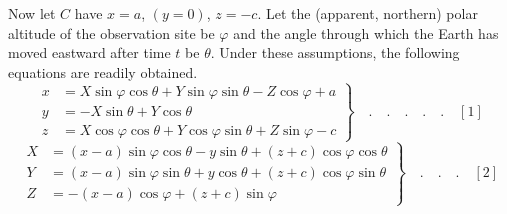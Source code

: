 Now let $C$ have $x=a$, $(y=0)$, $z=-c$. Let the (apparent, northern) polar altitude of the observation site be $\varphi$ and the angle through which the Earth has moved eastward after time $t$ be $\theta$. Under these assumptions, the following equations are readily obtained.
\[
\left.\begin{aligned}
x&=X\sin\varphi\cos\theta+Y\sin\varphi\sin\theta-Z\cos\varphi+a\\
y&=-X\sin\theta+Y\cos\theta\\
z&=X\cos\varphi\cos\theta+Y\cos\varphi\sin\theta+Z\sin\varphi-c
\end{aligned}\right\}\quad.\quad.\quad.\quad.\quad.\quad[1]
\]
\[
\left.\begin{aligned}
X&=(x-a)\sin\varphi\cos\theta-y\sin\theta+(z+c)\cos\varphi\cos\theta\\
Y&=(x-a)\sin\varphi\sin\theta+y\cos\theta+(z+c)\cos\varphi\sin\theta\\
Z&=-(x-a)\cos\varphi+(z+c)\sin\varphi
\end{aligned}\right\}\quad.\quad.\quad.\quad[2]
\]


